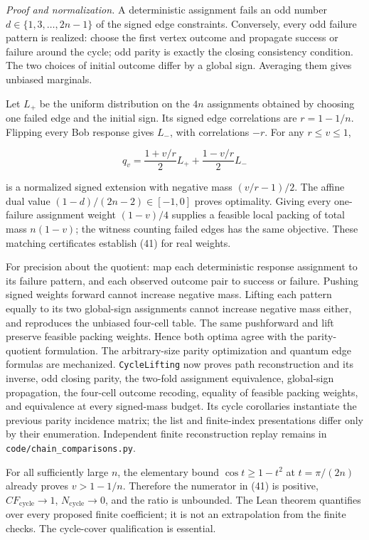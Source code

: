 \documentclass[
]{article}
\begin{document}
\emph{Proof and normalization.} A deterministic assignment fails an odd number \(d\in\{1,3,\ldots,2n-1\}\) of the signed edge constraints. Conversely, every odd failure pattern is realized: choose the first vertex outcome and propagate success or failure around the cycle; odd parity is exactly the closing consistency condition. The two choices of initial outcome differ by a global sign. Averaging them gives unbiased marginals.

Let \(L_+\) be the uniform distribution on the \(4n\) assignments obtained by choosing one failed edge and the initial sign. Its signed edge correlations are \(r=1-1/n\). Flipping every Bob response gives \(L_-\), with correlations \(-r\). For any \(r\le v\le1\),

\[
q_v=\frac{1+v/r}{2}L_++\frac{1-v/r}{2}L_-
\]

is a normalized signed extension with negative mass \((v/r-1)/2\). The affine dual value \((1-d)/(2n-2)\in[-1,0]\) proves optimality. Giving every one-failure assignment weight \((1-v)/4\) supplies a feasible local packing of total mass \(n(1-v)\); the witness counting failed edges has the same objective. These matching certificates establish (41) for real weights.

For precision about the quotient: map each deterministic response assignment to its failure pattern, and each observed outcome pair to success or failure. Pushing signed weights forward cannot increase negative mass. Lifting each pattern equally to its two global-sign assignments cannot increase negative mass either, and reproduces the unbiased four-cell table. The same pushforward and lift preserve feasible packing weights. Hence both optima agree with the parity-quotient formulation. The arbitrary-size parity optimization and quantum edge formulas are mechanized. \texttt{CycleLifting} now proves path reconstruction and its inverse, odd closing parity, the two-fold assignment equivalence, global-sign propagation, the four-cell outcome recoding, equality of feasible packing weights, and equivalence at every signed-mass budget. Its cycle corollaries instantiate the previous parity incidence matrix; the list and finite-index presentations differ only by their enumeration. Independent finite reconstruction replay remains in \texttt{code/chain\_comparisons.py}.

For all sufficiently large \(n\), the elementary bound \(\cos t\ge1-t^2\) at \(t=\pi/(2n)\) already proves \(v>1-1/n\). Therefore the numerator in (41) is positive, \(CF_{\mathrm{cycle}}\to1\), \(N_{\mathrm{cycle}}\to0\), and the ratio is unbounded. The Lean theorem quantifies over every proposed finite coefficient; it is not an extrapolation from the finite checks. The cycle-cover qualification is essential.
\end{document}
